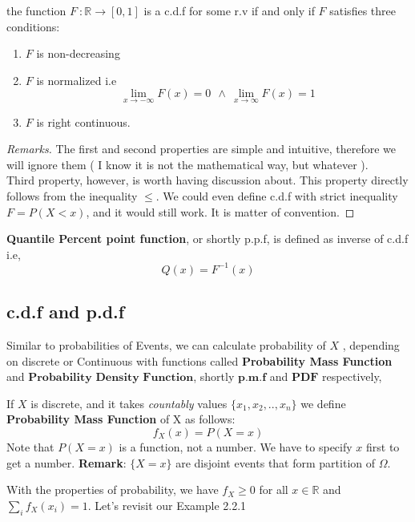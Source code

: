 \begin{theorem}
    the function $F \ : \mathbb{R} \rightarrow [0,1]$ is a c.d.f for some r.v if and only if $F$ satisfies three conditions:
    \begin{enumerate}
        \item $F$ is non-decreasing
        \item $F$ is normalized i.e \[ \lim_{x \rightarrow -\infty} F(x) = 0\ \ \land \ \lim_{x \rightarrow \infty} F(x) =1 \]
        \item $F$ is right continuous.
    \end{enumerate}
    \begin{proof}[Remarks]
        The first and second properties are simple and intuitive, therefore we will ignore them ( I know it is not the mathematical way, but whatever   ). \\
        
        Third property, however, is worth having discussion about. This property directly follows from the inequality $\le$. We could even define c.d.f with strict inequality $F= P(X<x)$, and it would still work. It is matter of convention.
    \end{proof}
\end{theorem}
\begin{definition}
    \textbf{Quantile Percent point function}, or shortly p.p.f, is defined as inverse of c.d.f i.e,
    \[Q(x) = F^{-1}(x)\]
\end{definition}
\subsection*{c.d.f and p.d.f}
Similar to probabilities of Events, we can calculate probability of $X$ , depending on discrete or Continuous with functions called \textbf{ Probability Mass Function} and $\textbf{Probability Density Function}$, shortly $\textbf{p.m.f}$ and $\textbf{PDF}$ respectively,

\begin{definition}
    If $X$ is discrete, and it takes \textit{countably} values $ \{ x_1,x_2,..,
    x_n \}$ we define \textbf{Probability Mass Function} of X as follows:
    $$f_X(x)= P(X = x)$$
    Note that $P(X = x)$ is a function, not a number. We have to specify $x$ first to get a number.
    \textbf{Remark}: $ \{ X=x \} $ are disjoint events that form partition of $\Omega$.
\end{definition}

   With the properties of probability, we have $f_X \ge 0$ for all $x \in \mathbb{R}$ and $\sum_{i} f_X (x_i) =1 $. Let's revisit our Example 2.2.1

